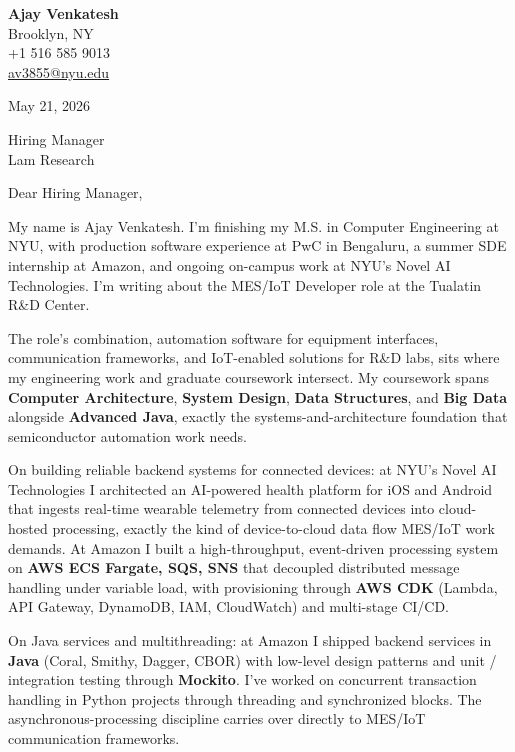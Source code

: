 \documentclass[letterpaper,11pt]{article}
\begin{document}
\begin{flushleft}
\textbf{\large Ajay Venkatesh} \\
Brooklyn, NY \\
+1 516 585 9013 \\
\href{mailto:av3855@nyu.edu}{av3855@nyu.edu}
\end{flushleft}
\vspace{10pt}
May 21, 2026
\vspace{6pt}

Hiring Manager \\
Lam Research

\vspace{10pt}

Dear Hiring Manager,

My name is Ajay Venkatesh. I'm finishing my M.S. in Computer Engineering at NYU, with production software experience at PwC in Bengaluru, a summer SDE internship at Amazon, and ongoing on-campus work at NYU's Novel AI Technologies. I'm writing about the MES/IoT Developer role at the Tualatin R\&D Center.

The role's combination, automation software for equipment interfaces, communication frameworks, and IoT-enabled solutions for R\&D labs, sits where my engineering work and graduate coursework intersect. My coursework spans \textbf{Computer Architecture}, \textbf{System Design}, \textbf{Data Structures}, and \textbf{Big Data} alongside \textbf{Advanced Java}, exactly the systems-and-architecture foundation that semiconductor automation work needs.

On building reliable backend systems for connected devices: at NYU's Novel AI Technologies I architected an AI-powered health platform for iOS and Android that ingests real-time wearable telemetry from connected devices into cloud-hosted processing, exactly the kind of device-to-cloud data flow MES/IoT work demands. At Amazon I built a high-throughput, event-driven processing system on \textbf{AWS ECS Fargate, SQS, SNS} that decoupled distributed message handling under variable load, with provisioning through \textbf{AWS CDK} (Lambda, API Gateway, DynamoDB, IAM, CloudWatch) and multi-stage CI/CD.

On Java services and multithreading: at Amazon I shipped backend services in \textbf{Java} (Coral, Smithy, Dagger, CBOR) with low-level design patterns and unit / integration testing through \textbf{Mockito}. I've worked on concurrent transaction handling in Python projects through threading and synchronized blocks. The asynchronous-processing discipline carries over directly to MES/IoT communication frameworks.
\end{document}
